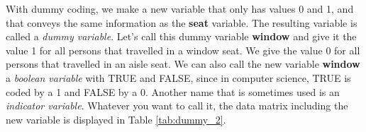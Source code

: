With dummy coding, we make a new variable that only has values 0 and 1, and that conveys the same information as the \textbf{seat} variable. The resulting variable is called a \textit{dummy variable}. Let's call this dummy variable \textbf{window} and give it the value 1 for all persons that travelled in a window seat. We give the value 0 for all persons that travelled in an aisle seat. We can also call the new variable \textbf{window} a \textit{boolean variable} with TRUE and FALSE, since in computer science, TRUE is coded by a 1 and FALSE by a 0. Another name that is sometimes used is an \textit{indicator variable}. Whatever you want to call it, the data matrix including the new variable is displayed in Table \ref{tab:dummy_2}.

\begin{kframe}


{\ttfamily\noindent\bfseries\color{errorcolor}{\#\# Error in data.frame(person, seat, window, price): object 'price' not found}}

{\ttfamily\noindent\bfseries{}}

{\ttfamily\noindent\bfseries\color{errorcolor}{\#\# Error in eval(predvars, data, env): object 'price' not found}}\end{kframe}





















